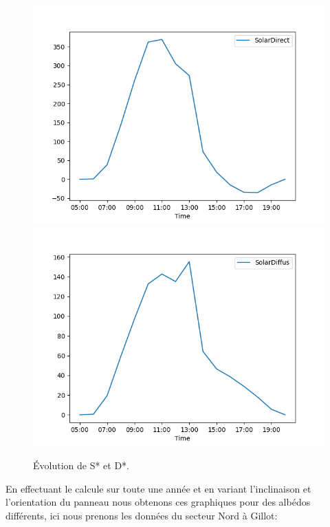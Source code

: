 \documentclass[12pt,a4paper,openright]{report}
\begin{document}
\begin{figure}[h]
\begin{center}
\includegraphics[scale=0.45]{figSolardirect}
\hspace{1cm}
\includegraphics[scale=0.45]{figSolardiffus}
\caption{Évolution de S* et D*.}
\end{center}
\end{figure}
\newpage
En effectuant le calcule sur toute une année et en variant l'inclinaison et l'orientation du panneau nous obtenons ces graphiques pour des albédos différents, ici nous prenons les données du secteur Nord à Gillot:
\end{document}
